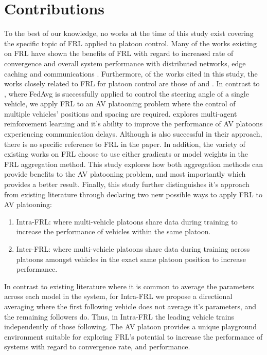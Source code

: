 \section{Contributions}
To the best of our knowledge, no works at the time of this study exist covering the specific topic of FRL applied to platoon control. Many of the works existing on FRL have shown the benefits of FRL with regard to increased rate of convergence and overall system performance with distributed networks, edge caching and communications \cite{ZhangX2020, LimHyun2021, WangXiaofei2021, Huang2021}.  Furthermore, of the works cited in this study, the works closely related to FRL for platoon control are those of \cite{Peake2020} and \cite{Liang2019}.  In contrast to \cite{Liang2019}, where FedAvg is successfully applied to control the steering angle of a single vehicle, we apply FRL to an AV platooning problem where the control of multiple vehicles' positions and spacing are required.  \cite{Peake2020} explores multi-agent reinforcement learning and it's ability to improve the performance of AV platoons experiencing communication delays.  Although \cite{Peake2020} is also successful in their approach, there is no specific reference to FRL in the paper. In addition, the variety of existing works on FRL choose to use either gradients or model weights in the FRL aggregation method.  This study explores how both aggregation methods can provide benefits to the AV platooning problem, and most importantly which provides a better result. Finally, this study further distinguishes it's approach from existing literature through declaring two new possible ways to apply FRL to AV platooning:

\begin{enumerate}
    \item Intra-FRL: where multi-vehicle platoons share data during training to increase the performance of vehicles within the same platoon.
    \item Inter-FRL: where multi-vehicle platoons share data during training across platoons amongst vehicles in the exact same platoon position to increase performance.
\end{enumerate}

In contrast to existing literature where it is common to average the parameters across each model in the system, for Intra-FRL we propose a directional averaging where the first following vehicle does not average it's parameters, and the remaining followers do. Thus, in Intra-FRL the leading vehicle trains independently of those following. The AV platoon provides a unique playground environment suitable for exploring FRL's potential to increase the performance of systems with regard to convergence rate, and performance.

